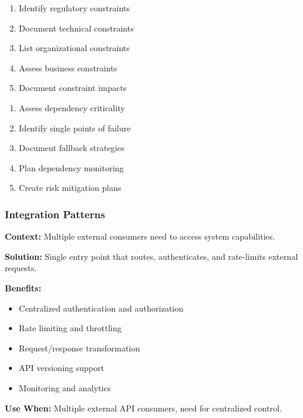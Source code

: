 \documentclass[11pt,letterpaper]{article}
\begin{document}
\begin{guidancebox}
\begin{enumerate}[nosep]
    \item Identify regulatory constraints
    \item Document technical constraints
    \item List organizational constraints
    \item Assess business constraints
    \item Document constraint impacts
\end{enumerate}
\end{guidancebox}

\begin{guidancebox}
\begin{enumerate}[nosep]
    \item Assess dependency criticality
    \item Identify single points of failure
    \item Document fallback strategies
    \item Plan dependency monitoring
    \item Create risk mitigation plans
\end{enumerate}
\end{guidancebox}

\subsubsection{Integration Patterns}

\begin{patternbox}
\textbf{Context:} Multiple external consumers need to access system capabilities.

\textbf{Solution:} Single entry point that routes, authenticates, and rate-limits external requests.

\textbf{Benefits:}
\begin{itemize}[nosep]
    \item Centralized authentication and authorization
    \item Rate limiting and throttling
    \item Request/response transformation
    \item API versioning support
    \item Monitoring and analytics
\end{itemize}

\textbf{Use When:} Multiple external API consumers, need for centralized control.
\end{patternbox}
\end{document}
